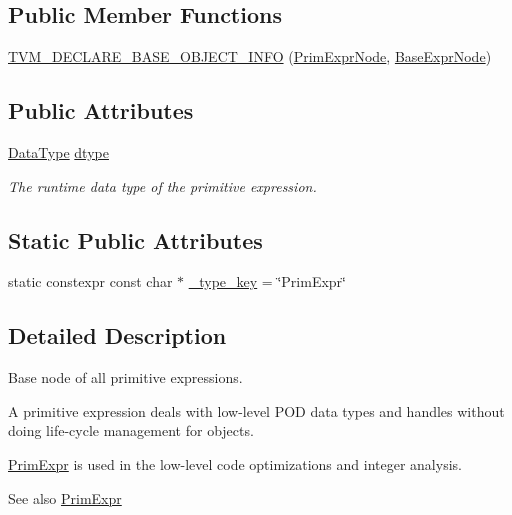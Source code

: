 \subsection*{Public Member Functions}
\begin{DoxyCompactItemize}
\item 
\hyperlink{classtvm_1_1PrimExprNode_afcf4654378d65e0200b33e43194d0490}{T\+V\+M\+\_\+\+D\+E\+C\+L\+A\+R\+E\+\_\+\+B\+A\+S\+E\+\_\+\+O\+B\+J\+E\+C\+T\+\_\+\+I\+N\+FO} (\hyperlink{classtvm_1_1PrimExprNode}{Prim\+Expr\+Node}, \hyperlink{classtvm_1_1BaseExprNode}{Base\+Expr\+Node})
\end{DoxyCompactItemize}
\subsection*{Public Attributes}
\begin{DoxyCompactItemize}
\item 
\hyperlink{namespacetvm_a41918af1a1dc386388639a9d3ad06c5d}{Data\+Type} \hyperlink{classtvm_1_1PrimExprNode_a95af9234514ec5f11355db41524be7f9}{dtype}
\begin{DoxyCompactList}\small\item\em The runtime data type of the primitive expression. \end{DoxyCompactList}\end{DoxyCompactItemize}
\subsection*{Static Public Attributes}
\begin{DoxyCompactItemize}
\item 
static constexpr const char $\ast$ \hyperlink{classtvm_1_1PrimExprNode_a9dc9d675de8446078c93ed9cb50bae6e}{\+\_\+type\+\_\+key} = \char`\"{}Prim\+Expr\char`\"{}
\end{DoxyCompactItemize}


\subsection{Detailed Description}
Base node of all primitive expressions. 

A primitive expression deals with low-\/level P\+OD data types and handles without doing life-\/cycle management for objects.

\hyperlink{classtvm_1_1PrimExpr}{Prim\+Expr} is used in the low-\/level code optimizations and integer analysis.

\begin{DoxySeeAlso}{See also}
\hyperlink{classtvm_1_1PrimExpr}{Prim\+Expr} 
\end{DoxySeeAlso}


